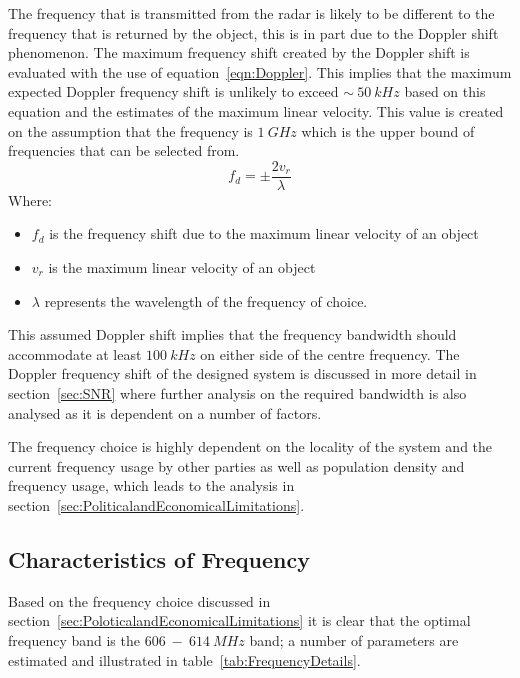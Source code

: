 \documentclass[11pt]{witseiepaper}
\begin{document}
The frequency that is transmitted from the radar is likely to be different to the frequency that is returned by the object, this is in part due to the Doppler shift phenomenon. The maximum frequency shift created by the Doppler shift is evaluated with the use of equation~\ref{eqn:Doppler}. This implies that the maximum expected Doppler frequency shift is unlikely to exceed $\sim~50~kHz$ based on this equation and the estimates of the maximum linear velocity. This value is created on the assumption that the frequency is $1~GHz$ which is the upper bound of frequencies that can be selected from.
\begin{equation} \label{eqn:Doppler}
    f_{d} = \pm \frac{2 v_{r}}{\lambda}    
\end{equation}
Where:
\begin{itemize}
    \item $f_{d}$ is the frequency shift due to the maximum linear velocity of an object
    \item $v_{r}$ is the maximum linear velocity of an object
    \item $\lambda$ represents the wavelength of the frequency of choice.
\end{itemize}
This assumed Doppler shift implies that the frequency bandwidth should accommodate at least $100~kHz$ on either side of the centre frequency.
The Doppler frequency shift of the designed system is discussed in more detail in section~\ref{sec:SNR} where further analysis on the required bandwidth is also analysed as it is dependent on a number of factors.

The frequency choice is highly dependent on the locality of the system and the current frequency usage by other parties as well as population density and frequency usage, which leads to the analysis in section~\ref{sec:PoliticalandEconomicalLimitations}.


\subsection{Characteristics of Frequency}
Based on the frequency choice discussed in section~\ref{sec:PoloticalandEconomicalLimitations} it is clear that the optimal frequency band is the $606~-~614~MHz$ band; a number of parameters are estimated and illustrated in table~\ref{tab:FrequencyDetails}.
\end{document}

